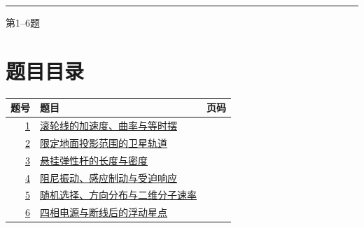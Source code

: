 \documentclass[UTF8,fontset=fandol,a4paper,11pt]{ctexart}
\begin{document}

\thispagestyle{empty}\vspace*{22mm}

\par\vspace{12mm}

\par\vspace{12mm}

\par\vspace{9mm}

\noindent\textcolor{accent}{\rule{\linewidth}{1pt}}\par\vspace{9mm}

\noindent 第1--6题\par\vfill\clearpage

\section*{题目目录}

\begin{longtable}{@{}r p{113mm} r@{}}\toprule 题号 & 题目 & 页码\\\midrule

\hyperref[q:1]{1} & \hyperref[q:1]{滚轮线的加速度、曲率与等时摆} & \pageref{q:1} \\

\hyperref[q:2]{2} & \hyperref[q:2]{限定地面投影范围的卫星轨道} & \pageref{q:2} \\

\hyperref[q:3]{3} & \hyperref[q:3]{悬挂弹性杆的长度与密度} & \pageref{q:3} \\

\hyperref[q:4]{4} & \hyperref[q:4]{阻尼振动、感应制动与受迫响应} & \pageref{q:4} \\

\hyperref[q:5]{5} & \hyperref[q:5]{随机选择、方向分布与二维分子速率} & \pageref{q:5} \\

\hyperref[q:6]{6} & \hyperref[q:6]{四相电源与断线后的浮动星点} & \pageref{q:6} \\

\bottomrule\end{longtable}

\clearpage
\end{document}
